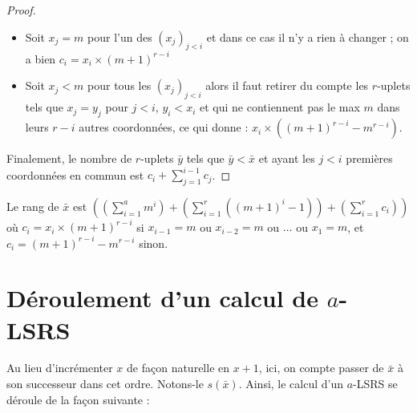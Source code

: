 \begin{proof}
			\begin{itemize}[itemsep=-1mm]
				\item	Soit $x_j = m$ pour l'un des $\left(x_j\right)_{j < i}$ et dans ce cas il n'y a rien à changer ; on a bien $c_i = x_i \times \left(m+1\right)^{r-i}$
				\item 	Soit $x_j < m$ pour tous les $\left(x_j\right)_{j < i}$ alors il faut retirer du compte les $r$-uplets tels que $x_j = y_j$ pour $j < i$, $y_i < x_i$ et qui ne contiennent pas le max $m$ dans leurs $r-i$ autres coordonnées, ce qui donne : $x_i \times \left(\left(m+1\right)^{r-i} - m^{r-i}\right)$.
			\end{itemize}
			
			Finalement, le nombre de $r$-uplets $\bar{y}$ tels que $\bar{y} < \bar{x}$ et ayant les $j<i$ premières coordonnées en commun est $c_i + \sum_{j=1}^{i-1} c_j$.
		\end{proof}
		
		\begin{coro}
			\label{coro:rang_bon_ordre}
			Le rang de $\bar{x}$ est $\left( \left( \sum_{i=1}^{a} m^i \right) + \left( \sum_{i=1}^{r} \left( \left(m+1\right)^i -1 \right) \right) + \left(\sum_{i=1}^{r} c_i \right) \right)$ où $c_i = x_i \times \left(m+1\right)^{r-i}$ si $x_{i-1} = m$ ou $x_{i-2} = m$ ou $\dots$ ou $x_{1} = m$, et $c_i = \left(m+1\right)^{r-i}-m^{r-i}$ sinon. 
		\end{coro}
		
		
	
	\section{Déroulement d'un calcul de $a$-LSRS}
	\label{par:deroulement_aLSRS}
	Au lieu d'incrémenter $x$ de façon naturelle en $x+1$, ici, on compte passer de $\bar{x}$ à son successeur dans cet ordre. Notons-le $s\left(\bar{x}\right)$. Ainsi, le calcul d'un $a$-LSRS se déroule de la façon suivante :
	
